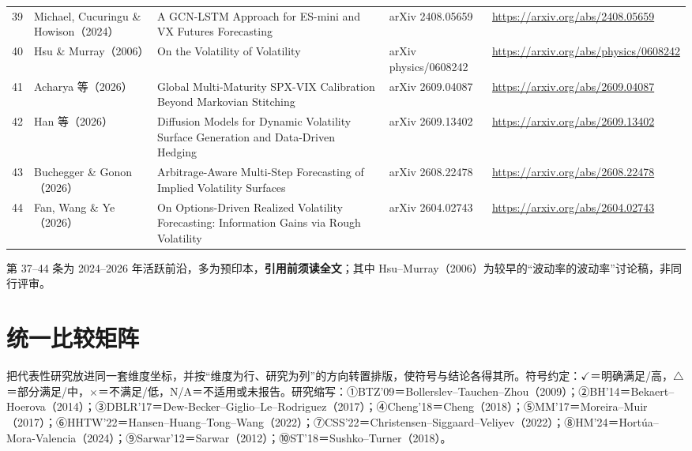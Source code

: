 \documentclass[11pt,a4paper]{article}
\begin{document}
\begin{center}
\begin{longtable}{@{}c L{0.225\textwidth} L{0.30\textwidth} L{0.155\textwidth} L{0.19\textwidth}@{}}
39 & Michael, Cucuringu \& Howison（2024） & A GCN-LSTM Approach for ES-mini and VX Futures Forecasting & arXiv 2408.05659 & \url{https://arxiv.org/abs/2408.05659} \\
40 & Hsu \& Murray（2006） & On the Volatility of Volatility & arXiv physics/0608242 & \url{https://arxiv.org/abs/physics/0608242} \\
41 & Acharya 等（2026） & Global Multi-Maturity SPX-VIX Calibration Beyond Markovian Stitching & arXiv 2609.04087 & \url{https://arxiv.org/abs/2609.04087} \\
42 & Han 等（2026） & Diffusion Models for Dynamic Volatility Surface Generation and Data-Driven Hedging & arXiv 2609.13402 & \url{https://arxiv.org/abs/2609.13402} \\
43 & Buchegger \& Gonon（2026） & Arbitrage-Aware Multi-Step Forecasting of Implied Volatility Surfaces & arXiv 2608.22478 & \url{https://arxiv.org/abs/2608.22478} \\
44 & Fan, Wang \& Ye（2026） & On Options-Driven Realized Volatility Forecasting: Information Gains via Rough Volatility & arXiv 2604.02743 & \url{https://arxiv.org/abs/2604.02743} \\
\bottomrule
\end{longtable}
\end{center}

\noindent 第 37--44 条为 2024--2026 年活跃前沿，多为预印本，\textbf{引用前须读全文}；其中 Hsu--Murray（2006）为较早的“波动率的波动率”讨论稿，非同行评审。

\newpage
\section{统一比较矩阵}

把代表性研究放进同一套维度坐标，并按“维度为行、研究为列”的方向转置排版，使符号与结论各得其所。符号约定：$\checkmark$＝明确满足/高，$\triangle$＝部分满足/中，$\times$＝不满足/低，N/A＝不适用或未报告。研究缩写：①BTZ'09＝Bollerslev--Tauchen--Zhou（2009）；②BH'14＝Bekaert--Hoerova（2014）；③DBLR'17＝Dew-Becker--Giglio--Le--Rodriguez（2017）；④Cheng'18＝Cheng（2018）；⑤MM'17＝Moreira--Muir（2017）；⑥HHTW'22＝Hansen--Huang--Tong--Wang（2022）；⑦CSS'22＝Christensen--Siggaard--Veliyev（2022）；⑧HM'24＝Hortúa--Mora-Valencia（2024）；⑨Sarwar'12＝Sarwar（2012）；⑩ST'18＝Sushko--Turner（2018）。
\end{document}
